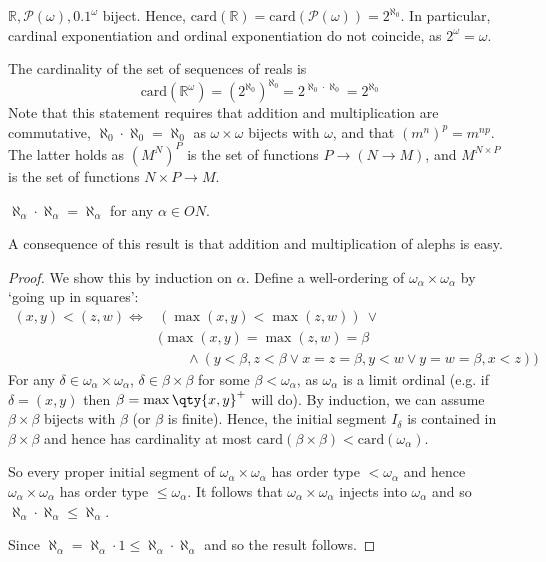 \begin{example}
    $\mathbb R, \mathcal P(\omega), \qty{0,1}^\omega$ biject.
    Hence, $\mathrm{card}(\mathbb R) = \mathrm{card}(\mathcal P(\omega)) = 2^{\aleph_0}$.
    In particular, cardinal exponentiation and ordinal exponentiation do not coincide, as $2^\omega = \omega$.

    The cardinality of the set of sequences of reals is
    \[ \mathrm{card}(\mathbb R^\omega) = (2^{\aleph_0})^{\aleph_0} = 2^{\aleph_0 \cdot \aleph_0} = 2^{\aleph_0} \]
    Note that this statement requires that addition and multiplication are commutative, $\aleph_0 \cdot \aleph_0 = \aleph_0$ as $\omega \times \omega$ bijects with $\omega$, and that $(m^n)^p = m^{np}$.
    The latter holds as $(M^N)^P$ is the set of functions $P \to (N \to M)$, and $M^{N \times P}$ is the set of functions $N \times P \to M$.
\end{example}

\begin{theorem}
    $\aleph_\alpha \cdot \aleph_\alpha = \aleph_\alpha$ for any $\alpha \in ON$.
\end{theorem}

A consequence of this result is that addition and multiplication of alephs is easy.

\begin{proof}
    We show this by induction on $\alpha$.
    Define a well-ordering of $\omega_\alpha \times \omega_\alpha$ by `going up in squares':
    \begin{align*}
        (x,y) < (z,w) \iff &(\max(x,y) < \max(z,w)) \ \vee \\
        &(\max(x,y) = \max(z,w) = \beta \\
        &\quad\quad\wedge (y < \beta, z < \beta \vee x = z = \beta, y < w \vee y = w = \beta, x < z))
    \end{align*}
    For any $\delta \in \omega_\alpha \times \omega_\alpha$, $\delta \in \beta \times \beta$ for some $\beta < \omega_\alpha$, as $\omega_\alpha$ is a limit ordinal (e.g. if $\delta = (x, y)$ then $\beta = \max\qty{x, y}^+$ will do).
    By induction, we can assume $\beta \times \beta$ bijects with $\beta$ (or $\beta$ is finite).
    Hence, the initial segment $I_\delta$ is contained in $\beta \times \beta$ and hence has cardinality at most $\mathrm{card}(\beta \times \beta) < \mathrm{card}(\omega_\alpha)$.

    So every proper initial segment of $\omega_\alpha \times \omega_\alpha$ has order type $ < \omega_\alpha$ and hence $\omega_\alpha \times \omega_\alpha$ has order type $\leq \omega_\alpha$.
    It follows that $\omega_\alpha \times \omega_\alpha$ injects into $\omega_\alpha$ and so $\aleph_\alpha \cdot \aleph_\alpha \leq \aleph_\alpha$.

    Since $\aleph_\alpha = \aleph_\alpha \cdot 1 \leq \aleph_\alpha \cdot \aleph_\alpha$ and so the result follows.
\end{proof}

